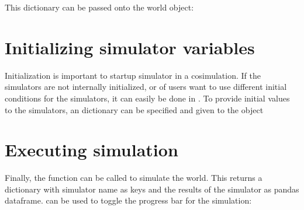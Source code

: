 \documentclass[letterpaper,10pt,english]{sphinxmanual}
\begin{document}
This dictionary can be passed onto the world object:

\begin{sphinxVerbatim}[commandchars=\\\{\}]
\end{sphinxVerbatim}


\section{Initializing simulator variables}
\label{\detokenize{index:initializing-simulator-variables}}
Initialization is important to start\sphinxhyphen{}up simulator in a cosimulation. If the simulators are not internally initialized, or of users want to use different initial conditions for the simulators, it can easily be done in . To provide initial values to the simulators, an  dictionary can be specified and given to the  object

\begin{sphinxVerbatim}[commandchars=\\\{\}]
    \PYG{p}{[}\PYG{p}{]} \PYG{p}{[}\PYG{p}{]}
                     \PYG{p}{[}\PYG{p}{]} \PYG{p}{[}\PYG{p}{]}
    
\end{sphinxVerbatim}


\section{Executing simulation}
\label{\detokenize{index:executing-simulation}}
Finally, the  function can be called to simulate the world.
This returns a dictionary with simulator name as keys and the results of
the simulator as pandas dataframe.  can be used to toggle the progress bar for the simulation:
\end{document}
